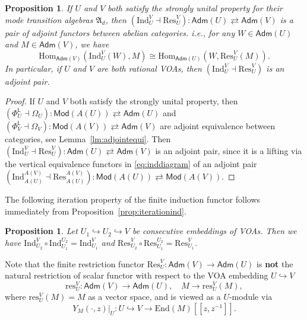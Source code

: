 \documentclass[12pt,a4paper,reqno]{amsart}
\numberwithin{equation}{section}
\numberwithin{equation}{section}
\newtheorem{prop}[thm]{Proposition}
\theoremstyle{definition}
\def \ra {\rightarrow}
\def\hr{\hookrightarrow}
\def \Hom {\mathrm{Hom}}
\def \End {\mathrm{End}}
\def\Ind{\mathrm{Ind}}
\def\Res{\mathrm{Res}}
\def\L{\mathcal{L}}
\def\Om{\Omega}
\def\Ind{\mathrm{Ind}}
\def\L{\mathsf{L}}
\def\fA{\mathfrak{A}}
\def\L{\mathsf{L}}
\def\adm{\mathsf{Adm}}
\begin{document}
	
	\begin{prop}\label{prop:adjointpari}
		If $U$ and $V$ both satisfy the strongly unital property for their mode transition algebras $\fA_d$, then $(\Ind^V_U\dashv \Res^V_U):\adm(U)\rightleftarrows \adm(V)$ is a pair of adjoint functors between abelian categories. i.e., for any $W\in \adm(U)$ and $M\in \adm(V)$, we have
		\begin{equation}
			\Hom_{\adm(V)}(\Ind^V_U(W),M)\cong \Hom_{\adm(U)}(W,\Res^V_U(M)).
		\end{equation}
		In particular,  if $U$ and $V$ are both rational VOAs, then $(\Ind^V_U\dashv \Res^V_U)$ is an adjoint pair. 
	\end{prop}
	\begin{proof}
		If $U$ and $V$ both satisfy the strongly unital property, then $(\Phi_U^\L\dashv \Om_U):\mathsf{Mod}(A(U))\rightleftarrows\mathsf{Adm}(U)$ and $(\Phi_V^\L\dashv \Om_V):\mathsf{Mod}(A(V))\rightleftarrows\mathsf{Adm}(V)$ are adjoint equivalence between categories, see Lemma~\ref{lm:adjointequi}. Then $(\Ind^V_U\dashv \Res^V_U):\adm(U)\rightleftarrows \adm(V)$ is an adjoint pair, since it is a lifting via the vertical equivalence functors in \eqref{eq:inddiagram} of an adjoint pair $(\Ind_{A(U)}^{A(V)}\dashv \mathrm{Res}^{A(V)}_{A(U)}):\mathsf{Mod}(A(U))\rightleftarrows \mathsf{Mod}(A(V))$.   
	\end{proof}
	
	The following iteration property of the finite induction functor follows immediately from Proposition~\ref{prop:iterationind}. 
	
	\begin{prop}\label{prop:compo}
		Let $U_1\hr U_2\hr V$ be consecutive embeddings of VOAs. Then we have $\Ind^V_{U_2}\circ \Ind^{U_2}_{U_1}=\Ind^V_{U_1}$ and $\Res^{V}_{U_2}\circ \Res^{U_2}_{U_1}=\Res^{V}_{U_1}$. 
	\end{prop}
	
	
		Note that the finite restriction functor 
	$
	\Res^V_U:\adm(V)\ra \adm(U)
	$
	is {\bf not} the natural restriction of scalar functor with respect to the VOA embedding $U\hr V$
	\begin{equation}\label{eq:affineres}
		\mathrm{res}^V_U: \adm(V)\ra \adm(U),\quad M\ra \mathrm{res}^V_U(M),
	\end{equation}
	where $\mathrm{res}^V_U(M)=M$ as a vector space, and is viewed as a $U$-module via $$Y_M(\cdot,z)|_U:U\hr V\rightarrow \End(M)[\![z,z^{-1}]\!].$$ 
	
\end{document}
